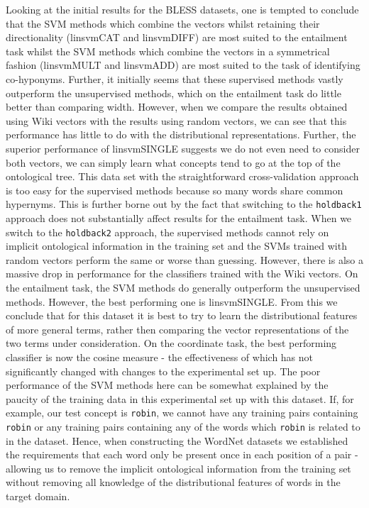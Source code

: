 \documentclass[11pt]{article}
\begin{document}
Looking at the initial results for the BLESS datasets, one is tempted to conclude that the SVM methods which combine the vectors whilst retaining their directionality (linsvmCAT and linsvmDIFF) are most suited to the entailment task whilst the SVM methods which combine the vectors in a symmetrical fashion (linsvmMULT and linsvmADD) are most suited to the task of identifying co-hyponyms.  Further, it initially seems that these supervised methods vastly outperform the unsupervised methods, which on the entailment task do little better than comparing width.  However, when we compare the results obtained using Wiki vectors with the results using random vectors, we can see that this performance has little to do with the distributional representations.  Further, the superior performance of linsvmSINGLE suggests we do not even need to consider both vectors, we can simply learn what concepts tend to go at the top of the ontological tree.  This data set with the straightforward cross-validation approach is too easy for the supervised methods because so many words share common hypernyms.  This is further borne out by the fact that switching to the \texttt{holdback1} approach does not substantially affect results for the entailment task.    When we switch to the \texttt{holdback2} approach, the supervised methods cannot rely on implicit ontological information in the training set and the SVMs trained with random vectors perform the same or worse than guessing.  However, there is also a massive drop in performance for the classifiers trained with the Wiki vectors.   On the entailment task, the SVM methods do generally outperform the unsupervised methods.  However, the best performing one is linsvmSINGLE.  From this we conclude that for this dataset it is best to try to learn the distributional features of more general terms, rather then comparing the vector representations of the two terms under consideration.   On the coordinate task, the best performing classifier is now the cosine measure - the effectiveness of which has not significantly changed with changes to the experimental set up.   The poor performance of the SVM methods here can be somewhat explained by the paucity of the training data in this experimental set up with this dataset.  If, for example, our test concept is \texttt{robin}, we cannot have any training pairs containing \texttt{robin} or any training pairs containing any of the words which \texttt{robin} is related to in the dataset.  Hence, when constructing the WordNet datasets we established the requirements that each word only be present once in each position of a pair - allowing us to remove the implicit ontological information from the training set without removing all knowledge of the distributional features of words in the target domain.
\end{document}
